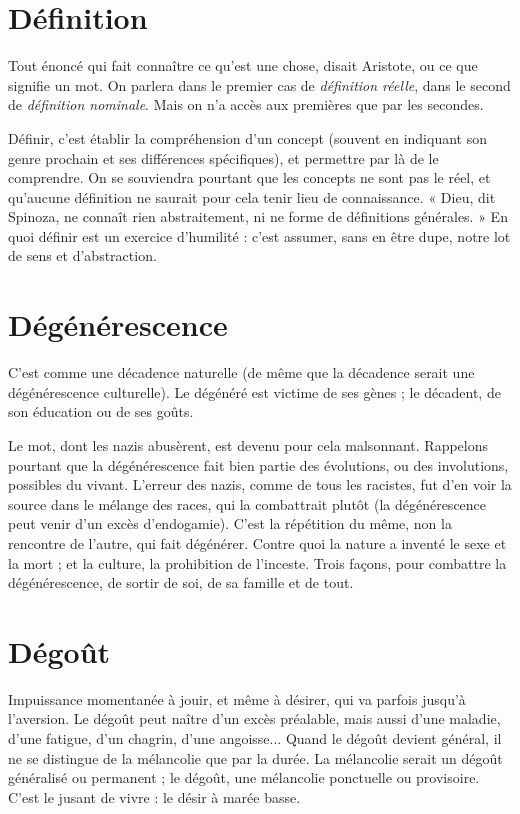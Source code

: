 \section{Définition}
Tout énoncé qui fait connaître ce qu’est une chose, disait
Aristote, ou ce que signifie un mot. On parlera dans le premier
cas de {\it définition réelle}, dans le second de {\it définition nominale}. Mais on n’a
accès aux premières que par les secondes.

Définir, c’est établir la compréhension d’un concept (souvent en indiquant
son genre prochain et ses différences spécifiques), et permettre par là de le comprendre.
On se souviendra pourtant que les concepts ne sont pas le réel, et
qu'aucune définition ne saurait pour cela tenir lieu de connaissance. « Dieu, dit
Spinoza, ne connaît rien abstraitement, ni ne forme de définitions générales. »
En quoi définir est un exercice d’humilité : c’est assumer, sans en être dupe,
notre lot de sens et d’abstraction.

\section{Dégénérescence}
C’est comme une décadence naturelle (de même
que la décadence serait une dégénérescence culturelle).
Le dégénéré est victime de ses gènes ; le décadent, de son éducation ou
de ses goûts.

Le mot, dont les nazis abusèrent, est devenu pour cela malsonnant. Rappelons
pourtant que la dégénérescence fait bien partie des évolutions, ou des
involutions, possibles du vivant. L'erreur des nazis, comme de tous les racistes,
fut d’en voir la source dans le mélange des races, qui la combattrait plutôt (la
dégénérescence peut venir d’un excès d’endogamie). C’est la répétition du
même, non la rencontre de l’autre, qui fait dégénérer. Contre quoi la nature a
inventé le sexe et la mort ; et la culture, la prohibition de l’inceste. Trois façons,
pour combattre la dégénérescence, de sortir de soi, de sa famille et de tout.

\section{Dégoût}
Impuissance momentanée à jouir, et même à désirer, qui va
parfois jusqu’à l’aversion. Le dégoût peut naître d’un excès préalable,
mais aussi d’une maladie, d’une fatigue, d’un chagrin, d’une angoisse...
Quand le dégoût devient général, il ne se distingue de la mélancolie que par la
durée. La mélancolie serait un dégoût généralisé ou permanent ; le dégoût, une
mélancolie ponctuelle ou provisoire. C’est le jusant de vivre : le désir à marée
basse.

